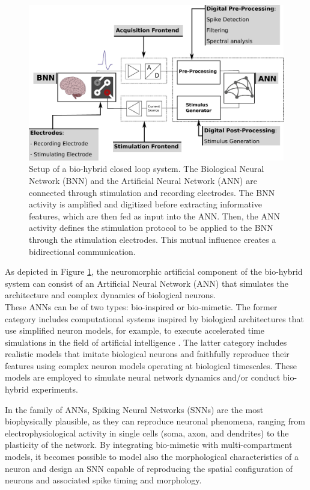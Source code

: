 \begin{figure}[ht!]
    \begin{center}
    \includegraphics[width=0.9\linewidth]{Figure/Bio-Hybrid Closed Loop System.jpg}
    \end{center}
    \caption{\protect\cite{George2020} Setup of a bio-hybrid closed loop system. The Biological Neural Network (BNN) and the Artificial Neural Network (ANN) are connected through stimulation and recording electrodes. The BNN activity is amplified and digitized before extracting informative features, which are then fed as input into the ANN. Then, the ANN activity defines the stimulation protocol to be applied to the BNN through the stimulation electrodes. This mutual influence creates a bidirectional communication.}
    \label{fig:Bio-Hybrid Closed Loop System}
\end{figure}

As depicted in Figure \ref{fig:Bio-Hybrid Closed Loop System}, the neuromorphic artificial component of the bio-hybrid system can consist of an Artificial Neural Network (ANN) that simulates the architecture and complex dynamics of biological neurons.\\
These ANNs can be of two types: bio-inspired or bio-mimetic. The former category includes computational systems inspired by biological architectures that use simplified neuron models, for example, to execute accelerated time simulations in the field of artificial intelligence \cite{Tavanaei2019}. The latter category includes realistic models that imitate biological neurons and faithfully reproduce their features using complex neuron models operating at biological timescales. These models are employed to simulate neural network dynamics and/or conduct bio-hybrid experiments.

In the family of ANNs, Spiking Neural Networks (SNNs) are the most biophysically plausible, as they can reproduce neuronal phenomena, ranging from electrophysiological activity in single cells (soma, axon, and dendrites) to the plasticity of the network. By integrating bio-mimetic with multi-compartment models, it becomes possible to model also the morphological characteristics of a neuron and design an SNN capable of reproducing the spatial configuration of neurons and associated spike timing and morphology.

